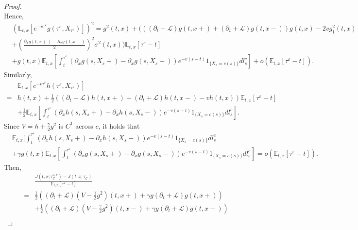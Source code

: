 \documentclass[11pt]{article}
\begin{document}
\begin{proof}
\begin{equation}
\end{equation}
Hence,
\begin{equation*}
\begin{split}
  &(\mathbb E_{t,x}[e^{-v\tau^{\varepsilon}}g(\tau^{\varepsilon},X_{\tau^{\varepsilon}})] )^2=g^2(t,x)+\bigg( ((\partial_t+\mathcal L)g(t,x+)+(\partial_t+\mathcal L)g(t,x-))g(t,x)-2vg^2_1(t,x)\\
&+\left(\frac{\partial_x g(t,x+)-\partial_x g(t,x-)}{2}\right)^2\sigma^2(t,x)\bigg)\mathbb E_{t,x}[\tau^{\varepsilon}-t]\\
  &+g(t,x)\mathbb E_{t,x}[\int_t^{\tau^{\varepsilon}}(\partial_x g(s,X_s+)-\partial_x g(s,X_s-))e^{-v(s-t)}1_{\{X_s=c(s)\}}dl^c_s] +o(\mathbb E_{t,x}[\tau^{\varepsilon}-t]).
  \end{split}
\end{equation*}
Similarly,
\begin{equation*}
\begin{split}
&\mathbb E_{t,x}[e^{-v\tau^{\varepsilon}}h(\tau^{\varepsilon},X_{\tau^{\varepsilon}})]\\
=&h(t,x)+\frac{1}{2}\left( (\partial_t+\mathcal L)h(t,x+)+(\partial_t+\mathcal L)h(t,x-)-vh(t,x)\right)\mathbb E_{t,x}[\tau^{\varepsilon}-t]\\
&+\frac{1}{2}\mathbb E_{t,x}[ \int_t^{\tau^{\varepsilon}}(\partial_x h(s,X_s+)-\partial_x h(s,X_s-))e^{-v(s-t)}1_{\{X_s=c(s)\}}dl^c_s].
\end{split}
\end{equation*}
Since $V=h+\frac{\gamma}{2}g^2$ is $C^1$ across $c$, it holds that 
\begin{equation*}
\begin{split}
&\mathbb E_{t,x}[ \int_t^{\tau^{\varepsilon}}(\partial_x h(s,X_s+)-\partial_x h(s,X_s-))e^{-v(s-t)}1_{\{X_s=c(s)\}}dl^c_s\\
&+\gamma g(t,x)\mathbb E_{t,x}[\int_t^{\tau^{\varepsilon}}(\partial_x g(s,X_s+)-\partial_x g(s,X_s-))e^{-v(s-t)}1_{\{X_s=c(s)\}}dl^c_s]=o(\mathbb E_{t,x}[\tau^{\varepsilon}-t]).
\end{split}
\end{equation*}
Then,
\begin{equation*}
\begin{split}
&\frac{J(t,x;\tau_{\mathcal C}^{\varepsilon,v})-J(t,x;\tau_{\mathcal C})}{\mathbb E_{t,x}[\tau^{\varepsilon}-t]}\\
=&\frac{1}{2}\left((\partial_t+\mathcal L)(V-\frac{\gamma}{2}g^2)(t,x+)+\gamma g(\partial_t+\mathcal L)g(t,x+)\right)\\
&+\frac{1}{2}\left((\partial_t+\mathcal L)(V-\frac{\gamma}{2}g^2)(t,x-)+\gamma g(\partial_t+\mathcal L)g(t,x-)\right)\\

\end{split}
\end{equation*}
\end{proof}
\end{document}
